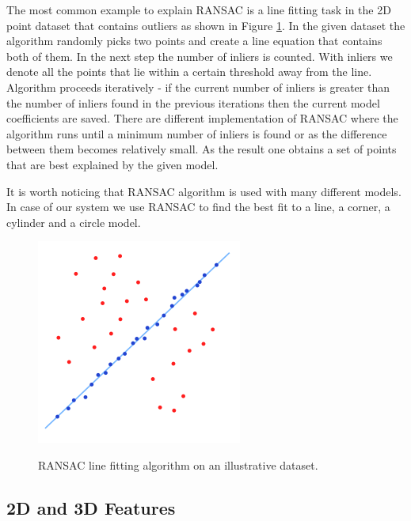 The most common example to explain RANSAC is a line fitting task in the 2D point dataset that contains outliers as shown in Figure \ref{fig:ransac}. In the given dataset the algorithm randomly picks two points and create a line equation that contains both of them. In the next step the number of inliers is counted. With inliers we denote all the points that lie within a certain threshold away from the line. Algorithm proceeds iteratively - if the current number of inliers is greater than the number of inliers found in the previous iterations then the current model coefficients are saved. There are different implementation of RANSAC where the algorithm runs until a minimum number of inliers is found or as the difference between them becomes relatively small. As the result one obtains a set of points that are best explained by the given model.

It is worth noticing that RANSAC algorithm is used with many different models. In case of our system we use RANSAC to find the best fit to a line, a corner, a cylinder and a circle model. 



\begin{figure}
\centering

{\includegraphics[width=0.3\columnwidth]{figures/ransac.png}}

\caption{RANSAC line fitting algorithm on an illustrative dataset.}
\label{fig:ransac}
\end{figure}



\subsection{2D and 3D Features}


